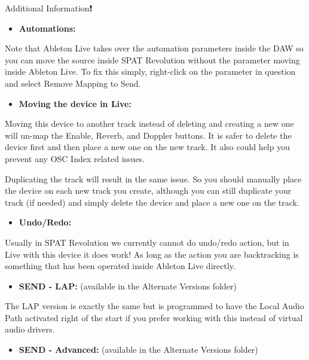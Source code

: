 \documentclass[
  letterpaper,
  DIV=11,
  numbers=noendperiod]{scrreport}
\providecommand{\tightlist}{%
  \setlength{\itemsep}{0pt}\setlength{\parskip}{0pt}}\usepackage{longtable,booktabs,array}
\begin{document}
Additional Information❗️

\begin{itemize}
\tightlist
\item
  \textbf{Automations:}
\end{itemize}

Note that Ableton Live takes over the automation parameters inside the
DAW so you can move the source inside SPAT Revolution without the
parameter moving inside Ableton Live. To fix this simply, right-click on
the parameter in question and select Remove Mapping to Send.

\begin{itemize}
\tightlist
\item
  \textbf{Moving the device in Live:}
\end{itemize}

Moving this device to another track instead of deleting and creating a
new one will un-map the Enable, Reverb, and Doppler buttons. It is safer
to delete the device first and then place a new one on the new track. It
also could help you prevent any OSC Index related issues.

Duplicating the track will result in the same issue. So you should
manually place the device on each new track you create, although you can
still duplicate your track (if needed) and simply delete the device and
place a new one on the track.

\begin{itemize}
\tightlist
\item
  \textbf{Undo/Redo:}
\end{itemize}

Usually in SPAT Revolution we currently cannot do undo/redo action, but
in Live with this device it does work! As long as the action you are
backtracking is something that has been operated inside Ableton Live
directly.

\begin{itemize}
\tightlist
\item
  \textbf{SEND - LAP:} (available in the Alternate Versions folder)
\end{itemize}

The LAP version is exactly the same but is programmed to have the Local
Audio Path activated right of the start if you prefer working with this
instead of virtual audio drivers.

\begin{itemize}
\tightlist
\item
  \textbf{SEND - Advanced:} (available in the Alternate Versions folder)
\end{itemize}
\end{document}
